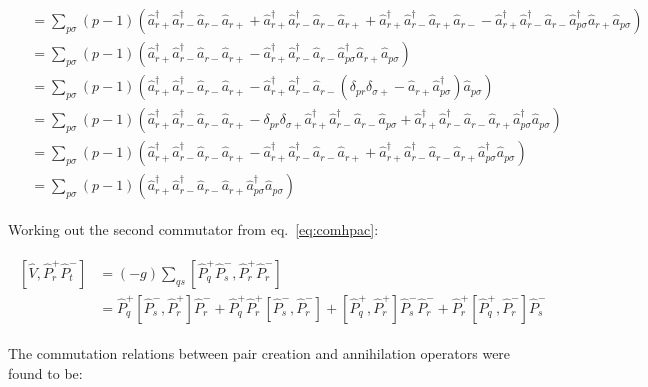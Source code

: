 \documentclass[11pt]{article}
\newcommand{\cop}[2]{%
	\ensuremath{ \hat{a} _{#1 #2} ^{\dagger} }}
\newcommand{\aop}[2]{%
	\ensuremath{ \hat{a} _{#1 #2} }}
\newcommand{\krondelt}[2]{%
	\ensuremath{ \delta _{#1 #2} }}
\newcommand{\vop}{
	\ensuremath{ \hat{V} } }
\newcommand{\ppop}[1]{%
	\ensuremath{ \hat{P} _{#1} ^+ } }
\newcommand{\pmop}[1]{%
	\ensuremath{ \hat{P} _{#1} ^- } }
\newcommand{\commutator}[2]{%
	\ensuremath{ \left [ #1,#2 \right ] }}
\begin{document}
\begin{align}
\begin{split}
	&= \sum_{p \sigma} (p-1) \left ( \cop{r}{+} \cop{r}{-} \aop{r}{-} \aop{r}{+} + \cop{r}{+} \cop{r}{-} \aop{r}{-} \aop{r}{+} + \cop{r}{+} \cop{r}{-} \aop{r}{+} \aop{r}{-} - \cop{r}{+} \cop{r}{-} \aop{r}{-} \cop{p}{\sigma} \aop{r}{+} \aop{p}{\sigma} \right )\\
	&= \sum_{p \sigma} (p-1) \left ( \cop{r}{+} \cop{r}{-} \aop{r}{-} \aop{r}{+} - \cop{r}{+} \cop{r}{-} \aop{r}{-} \cop{p}{\sigma} \aop{r}{+} \aop{p}{\sigma} \right )\\
	&= \sum_{p \sigma} (p-1) \left ( \cop{r}{+} \cop{r}{-} \aop{r}{-} \aop{r}{+} - \cop{r}{+} \cop{r}{-} \aop{r}{-} \left ( \krondelt{p}{r} \krondelt{\sigma}{+} - \aop{r}{+} \cop{p}{\sigma} \right ) \aop{p}{\sigma} \right )\\
	&= \sum_{p \sigma} (p-1) \left ( \cop{r}{+} \cop{r}{-} \aop{r}{-} \aop{r}{+} -\krondelt{p}{r} \krondelt{\sigma}{+} \cop{r}{+} \cop{r}{-} \aop{r}{-} \aop{p}{\sigma} + \cop{r}{+} \cop{r}{-} \aop{r}{-} \aop{r}{+} \cop{p}{\sigma} \aop{p}{\sigma} \right )\\
	&= \sum_{p \sigma} (p-1) \left ( \cop{r}{+} \cop{r}{-} \aop{r}{-} \aop{r}{+} - \cop{r}{+} \cop{r}{-} \aop{r}{-} \aop{r}{+} + \cop{r}{+} \cop{r}{-} \aop{r}{-} \aop{r}{+} \cop{p}{\sigma} \aop{p}{\sigma} \right )\\
	&= \sum_{p \sigma} (p-1) \left ( \cop{r}{+} \cop{r}{-} \aop{r}{-} \aop{r}{+} \cop{p}{\sigma} \aop{p}{\sigma} \right )
\end{split}
\label{eq:comhzpcap}
\end{align}

Working out the second commutator from eq.~\ref{eq:comhpac}:

\begin{align}
\begin{split}
	\commutator{\vop}{\ppop{r} \pmop{t}} &= (-g) \sum _{qs} \commutator{ \ppop{q} \pmop{s} }{ \ppop{r} \pmop{r}}\\
	&= \ppop{q} \commutator{\pmop{s}}{\ppop{r}} \pmop{r} + \ppop{q} \ppop{r} \commutator{\pmop{s}}{\pmop{r}} + \commutator{\ppop{q}}{\ppop{r}} \pmop{s} \pmop{r} +  \ppop{r} \commutator{\ppop{q}}{\pmop{r}} \pmop{s}
\end{split}
\label{eq:ctpcom}
\end{align}

The commutation relations between pair creation and annihilation operators were found to be:
\end{document}
